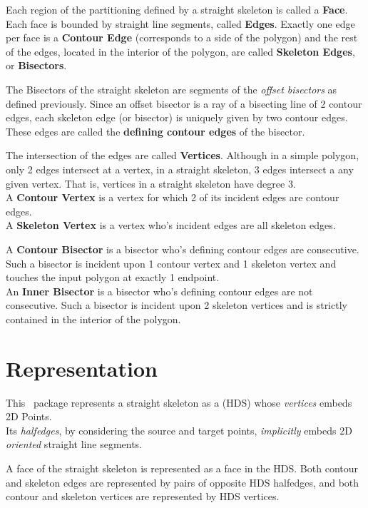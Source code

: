 Each region of the partitioning defined by a straight skeleton is called a \textbf{Face}. Each face is bounded by straight line segments, called \textbf{Edges}. Exactly one edge per face is a \textbf{Contour Edge} (corresponds to a side of the polygon) and the rest of the edges, located in the interior of the polygon, are called \textbf{Skeleton Edges}, or \textbf{Bisectors}.

The Bisectors of the straight skeleton are segments of the \textit{offset bisectors} as defined previously. Since an offset bisector is a ray of a bisecting line of 2 contour edges, each skeleton edge (or bisector) is  uniquely given by two contour edges. These edges are called the \textbf{defining contour edges} of the bisector. 

The intersection of the edges are called \textbf{Vertices}. Although in a simple polygon, only 2 edges intersect at a vertex, in a straight skeleton, 3 edges intersect a any given vertex. That is, vertices in a straight skeleton have degree 3.\\
A \textbf{Contour Vertex} is a vertex for which 2 of its incident edges are contour edges.\\
A \textbf{Skeleton Vertex} is a vertex who's incident edges are all skeleton edges.

A \textbf{Contour Bisector} is a bisector who's defining contour edges are consecutive. Such a bisector is incident upon 1 contour vertex and 1 skeleton vertex and touches the input polygon at exactly 1 endpoint.\\
An \textbf{Inner Bisector} is a bisector who's defining contour edges are not consecutive. Such a bisector is incident upon 2 skeleton vertices and is strictly contained in the interior of the polygon.



\section{Representation}

This \cgal\ package represents a straight skeleton as a  (HDS) whose \textit{vertices} embeds 2D Points.\\
Its \textit{halfedges}, by considering the source and target points, \textit{implicitly} embeds 2D \textit{oriented} straight line segments. 

A face of the straight skeleton is represented as a face in the HDS. Both contour and skeleton edges are represented by pairs of opposite HDS halfedges, and both contour and skeleton vertices are represented by HDS vertices.

